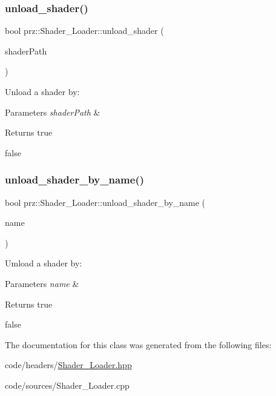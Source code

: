 \subsubsection{\texorpdfstring{unload\_shader()}{unload\_shader()}\hspace{0.1cm}{\footnotesize\ttfamily [2/2]}}
{\footnotesize\ttfamily bool prz\+::\+Shader\+\_\+\+Loader\+::unload\+\_\+shader (\begin{DoxyParamCaption}\item[{const P\+String \&}]{shader\+Path }\end{DoxyParamCaption})\hspace{0.3cm}{\ttfamily [inline]}}



Unload a shader by\+: 


\begin{DoxyParams}{Parameters}
{\em shader\+Path} & \\
\hline
\end{DoxyParams}
\begin{DoxyReturn}{Returns}
true 

false 
\end{DoxyReturn}
\mbox{\label{classprz_1_1_shader___loader_ad8290368553e59239f7e802823e0d542}} 
\subsubsection{\texorpdfstring{unload\_shader\_by\_name()}{unload\_shader\_by\_name()}}
{\footnotesize\ttfamily bool prz\+::\+Shader\+\_\+\+Loader\+::unload\+\_\+shader\+\_\+by\+\_\+name (\begin{DoxyParamCaption}\item[{const P\+String \&}]{name }\end{DoxyParamCaption})\hspace{0.3cm}{\ttfamily [inline]}}



Umload a shader by\+: 


\begin{DoxyParams}{Parameters}
{\em name} & \\
\hline
\end{DoxyParams}
\begin{DoxyReturn}{Returns}
true 

false 
\end{DoxyReturn}


The documentation for this class was generated from the following files\+:\begin{DoxyCompactItemize}
\item 
code/headers/\mbox{\hyperlink{_shader___loader_8hpp}{Shader\+\_\+\+Loader.\+hpp}}\item 
code/sources/Shader\+\_\+\+Loader.\+cpp\end{DoxyCompactItemize}
